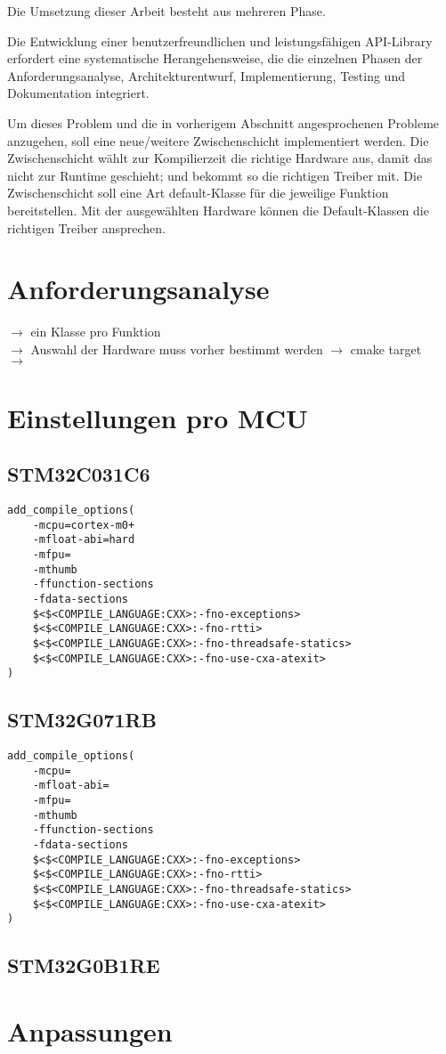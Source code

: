 Die Umsetzung dieser Arbeit besteht aus mehreren Phase.

Die Entwicklung einer benutzerfreundlichen und leistungsfähigen API-Library erfordert eine systematische Herangehensweise, die die einzelnen Phasen der Anforderungsanalyse, Architekturentwurf, Implementierung, Testing und Dokumentation integriert.
 


Um dieses Problem und die in vorherigem Abschnitt angesprochenen Probleme anzugehen, soll eine neue/weitere Zwischenschicht implementiert werden. 
Die Zwischenschicht wählt zur Kompilierzeit die richtige Hardware aus, damit das nicht zur Runtime geschieht; und bekommt so die richtigen Treiber mit.
Die Zwischenschicht soll eine Art default-Klasse für die jeweilige Funktion bereitstellen.
Mit der ausgewählten Hardware können die Default-Klassen die richtigen Treiber ansprechen.

\section{Anforderungsanalyse}
$\rightarrow$ ein Klasse pro Funktion \\
$\rightarrow$ Auswahl der Hardware muss vorher bestimmt werden $\rightarrow$ cmake target \\
$\rightarrow$  



\section{Einstellungen pro MCU}


\subsection{STM32C031C6}
\begin{lstlisting}
add_compile_options(
	-mcpu=cortex-m0+
	-mfloat-abi=hard
	-mfpu=
	-mthumb
	-ffunction-sections
	-fdata-sections
	$<$<COMPILE_LANGUAGE:CXX>:-fno-exceptions>
	$<$<COMPILE_LANGUAGE:CXX>:-fno-rtti>
	$<$<COMPILE_LANGUAGE:CXX>:-fno-threadsafe-statics>
	$<$<COMPILE_LANGUAGE:CXX>:-fno-use-cxa-atexit>		
)
\end{lstlisting}


\subsection{STM32G071RB}
\begin{lstlisting}
add_compile_options(
	-mcpu=
	-mfloat-abi=
	-mfpu=
	-mthumb
	-ffunction-sections
	-fdata-sections
	$<$<COMPILE_LANGUAGE:CXX>:-fno-exceptions>
	$<$<COMPILE_LANGUAGE:CXX>:-fno-rtti>
	$<$<COMPILE_LANGUAGE:CXX>:-fno-threadsafe-statics>
	$<$<COMPILE_LANGUAGE:CXX>:-fno-use-cxa-atexit>
)
\end{lstlisting}


\subsection{STM32G0B1RE}


\section{Anpassungen}

